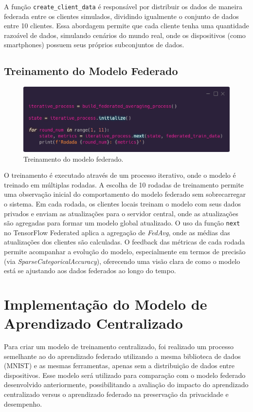 A função \texttt{create\_client\_data} é responsável por distribuir os dados de maneira federada entre os clientes simulados, dividindo igualmente o conjunto de dados entre 10 clientes. Essa abordagem permite que cada cliente tenha uma quantidade razoável de dados, simulando cenários do mundo real, onde os dispositivos (como smartphones) possuem seus próprios subconjuntos de dados.

\subsection{Treinamento do Modelo Federado}

\begin{figure}[ht]
    \centering
    \includegraphics[scale=0.25]{figuras/desenvolvimento/modelTraining.eps}
    \caption{Treinamento do modelo federado.}
    \label{fig:modelTraining}
\end{figure}

O treinamento é executado através de um processo iterativo, onde o modelo é treinado em múltiplas rodadas. A escolha de 10 rodadas de treinamento permite uma observação inicial do comportamento do modelo federado sem sobrecarregar o sistema. Em cada rodada, os clientes locais treinam o modelo com seus dados privados e enviam as atualizações para o servidor central, onde as atualizações são agregadas para formar um modelo global atualizado. O uso da função \texttt{next} no TensorFlow Federated aplica a agregação de \textit{FedAvg}, onde as médias das atualizações dos clientes são calculadas. O feedback das métricas de cada rodada permite acompanhar a evolução do modelo, especialmente em termos de precisão (via \textit{SparseCategoricalAccuracy}), oferecendo uma visão clara de como o modelo está se ajustando aos dados federados ao longo do tempo.

\section{Implementação do Modelo de Aprendizado Centralizado}

Para criar um modelo de treinamento centralizado, foi realizado um processo semelhante ao do aprendizado federado utilizando a mesma biblioteca de dados (MNIST) e as mesmas ferramentas, apenas sem a distribuição de dados entre dispositivos. Esse modelo será utilizado para comparação com o modelo federado desenvolvido anteriormente, possibilitando a avaliação do impacto do aprendizado centralizado versus o aprendizado federado na preservação da privacidade e desempenho.

